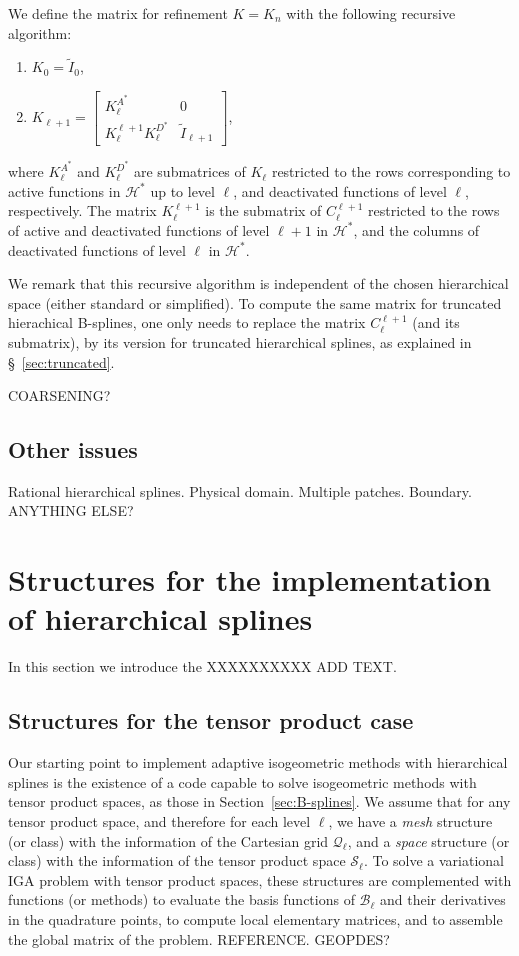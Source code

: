 \documentclass[a4paper]{siamltex1213}
\newcommand{\Rd}{\color{red}}
\newcommand\BB{\mathcal B}
\newcommand\QQ{\mathcal Q}
\newcommand\HH{\mathcal H}
\newcommand\VV{\mathcal S}
\let\tilde\widetilde
\begin{document}
We define the matrix for refinement $K = K_n$ with the following recursive algorithm:
\begin{enumerate}
\item $K_0 = \tilde I_0$,
\item $K_{\ell+1} = \left [ 
\begin{array}{cc}
K^{A^*}_\ell & 0 \\
K_\ell^{\ell+1} K^{D^*}_\ell & \tilde I_{\ell+1}
\end{array}
\right]$,
\end{enumerate}
where $K_\ell^{A^*}$ and $K_\ell^{D^*}$ are submatrices of $K_\ell$ restricted to the rows corresponding to {\Rd active functions in $\HH^*$ up to level $\ell$, and deactivated functions of level $\ell$, respectively. The matrix $K_\ell^{\ell+1}$ is the submatrix of $C_\ell^{\ell+1}$ restricted to the rows of active and deactivated functions of level $\ell+1$ in $\HH^*$, and the columns of deactivated functions of level $\ell$ in $\HH^*$. }

We remark that this recursive algorithm is independent of the chosen hierarchical space (either standard or simplified). To compute the same matrix for truncated hierachical B-splines, one only needs to replace the matrix $C_\ell^{\ell+1}$ (and its submatrix), by its version for truncated hierarchical splines, as explained in \S~\ref{sec:truncated}.

{\Rd COARSENING?}

\subsection{Other issues}
{\Rd Rational hierarchical splines. Physical domain. Multiple patches. Boundary. ANYTHING ELSE?}

\section{Structures for the implementation of hierarchical splines} \label{sec:structures}
In this section we introduce the {\Rd XXXXXXXXXX ADD TEXT}.

\subsection{Structures for the tensor product case}
Our starting point to implement adaptive isogeometric methods with hierarchical splines is the existence of a code capable to solve isogeometric methods with tensor product spaces, as those in Section~\ref{sec:B-splines}. We assume that for any tensor product space, and therefore for each level $\ell$, we have a \emph{mesh} structure (or class) with the information of the Cartesian grid $\QQ_\ell$, and a \emph{space} structure (or class) with the information of the tensor product space $\VV_\ell$. To solve a variational IGA problem with tensor product spaces, these structures are complemented with functions (or methods) to evaluate the basis functions of $\BB_\ell$ and their derivatives in the quadrature points, to compute local elementary matrices, and to assemble the global matrix of the problem. {\Rd REFERENCE. GEOPDES?}
\end{document}
